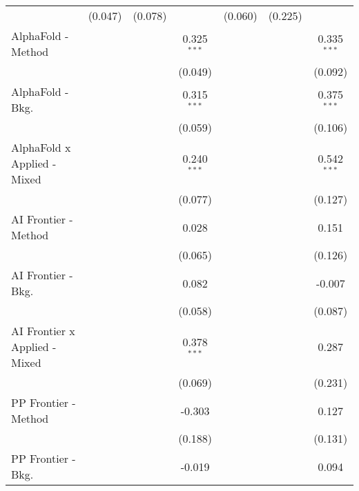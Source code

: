\begin{tabular}{lcccccc}
                                  & (0.047)       & (0.078)        &                & (0.060)       & (0.225)       &   \\   
   AlphaFold - Method             &               &                & 0.325$^{***}$  &               &               & 0.335$^{***}$\\   
                                  &               &                & (0.049)        &               &               & (0.092)\\   
   AlphaFold - Bkg.               &               &                & 0.315$^{***}$  &               &               & 0.375$^{***}$\\   
                                  &               &                & (0.059)        &               &               & (0.106)\\   
   AlphaFold x Applied - Mixed    &               &                & 0.240$^{***}$  &               &               & 0.542$^{***}$\\   
                                  &               &                & (0.077)        &               &               & (0.127)\\   
   AI Frontier - Method           &               &                & 0.028          &               &               & 0.151\\   
                                  &               &                & (0.065)        &               &               & (0.126)\\   
   AI Frontier - Bkg.             &               &                & 0.082          &               &               & -0.007\\   
                                  &               &                & (0.058)        &               &               & (0.087)\\   
   AI Frontier x Applied - Mixed  &               &                & 0.378$^{***}$  &               &               & 0.287\\   
                                  &               &                & (0.069)        &               &               & (0.231)\\   
   PP Frontier - Method           &               &                & -0.303         &               &               & 0.127\\   
                                  &               &                & (0.188)        &               &               & (0.131)\\   
   PP Frontier - Bkg.             &               &                & -0.019         &               &               & 0.094\\   

\end{tabular}
